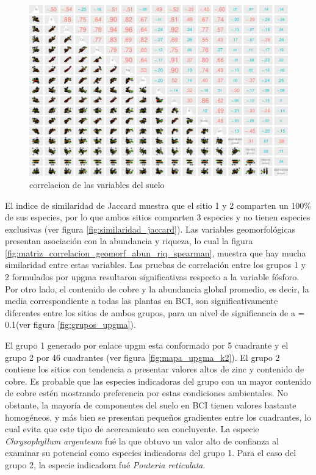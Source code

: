 \documentclass[11pt,]{article}
\begin{document}
\begin{figure}
\centering
\includegraphics{manuscrito_files/figure-latex/unnamed-chunk-4-1.pdf}
\caption{\label{fig:p_cor_suelo_ar}correlacion de las variables del
suelo}
\end{figure}

El indice de similaridad de Jaccard muestra que el sitio 1 y 2 comparten
un 100\% de sus especies, por lo que ambos sitios comparten 3 especies y
no tienen especies exclusivas (ver figura
\ref{fig:similaridad_jaccard}). Las variables geomorfológicas presentan
asociación con la abundancia y riqueza, lo cual la figura
\ref{fig:matriz_correlacion_geomorf_abun_riq_spearman}, muestra que hay
mucha similaridad entre estas variables. Las pruebas de correlación
entre los grupos 1 y 2 formulados por upgma resultaron significativas
respecto a la variable fósforo. Por otro lado, el contenido de cobre y
la abundancia global promedio, es decir, la media correspondiente a
todas las plantas en BCI, son significativamente diferentes entre los
sitios de ambos grupos, para un nivel de significancia de a = 0.1(ver
figura \ref{fig:grupos_upgma}).

El grupo 1 generado por enlace upgm esta conformado por 5 cuadrante y el
grupo 2 por 46 cuadrantes (ver figura \ref{fig:mapa_upgma_k2}). El grupo
2 contiene los sitios con tendencia a presentar valores altos de zinc y
contenido de cobre. Es probable que las especies indicadoras del grupo
con un mayor contenido de cobre estén mostrando preferencia por estas
condiciones ambientales. No obstante, la mayoría de componentes del
suelo en BCI tienen valores bastante homogéneos, y más bien se presentan
pequeños gradientes entre los cuadrantes, lo cual evita que este tipo de
acercamiento sea concluyente. La especie \emph{Chrysophyllum argenteum}
fué la que obtuvo un valor alto de confianza al examinar su potencial
como especies indicadoras del grupo 1. Para el caso del grupo 2, la
especie indicadora fué \emph{Pouteria reticulata}.
\end{document}
